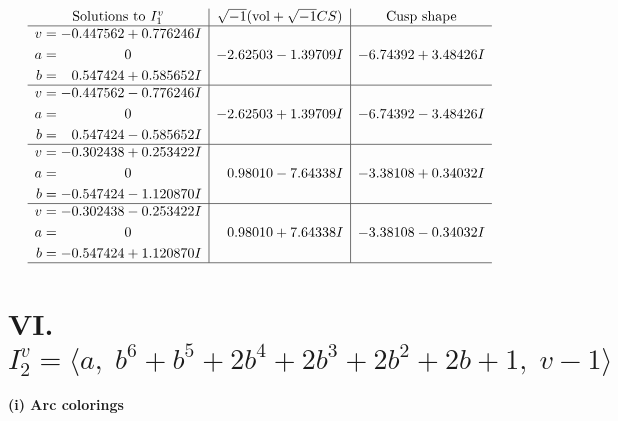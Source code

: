 \documentclass[1p]{elsarticle_modified}
\theoremstyle{definition}
\newcommand{\I}{\sqrt{-1}}
\begin{document}
$$\begin{array}{c|c|c}  
\text{Solutions to }I^v_{1}& \I (\text{vol} + \sqrt{-1}CS) & \text{Cusp shape}\\
 \hline 
\begin{aligned}
v &= -0.447562 + 0.776246 I \\
a &= \phantom{-0.000000 } 0 \\
b &= \phantom{-}0.547424 + 0.585652 I\end{aligned}
 & -2.62503 - 1.39709 I & -6.74392 + 3.48426 I \\ \hline\begin{aligned}
v &= -0.447562 - 0.776246 I \\
a &= \phantom{-0.000000 } 0 \\
b &= \phantom{-}0.547424 - 0.585652 I\end{aligned}
 & -2.62503 + 1.39709 I & -6.74392 - 3.48426 I \\ \hline\begin{aligned}
v &= -0.302438 + 0.253422 I \\
a &= \phantom{-0.000000 } 0 \\
b &= -0.547424 - 1.120870 I\end{aligned}
 & \phantom{-}0.98010 - 7.64338 I & -3.38108 + 0.34032 I \\ \hline\begin{aligned}
v &= -0.302438 - 0.253422 I \\
a &= \phantom{-0.000000 } 0 \\
b &= -0.547424 + 1.120870 I\end{aligned}
 & \phantom{-}0.98010 + 7.64338 I & -3.38108 - 0.34032 I\\
 \hline 
 \end{array}$$\newpage\newpage\renewcommand{\arraystretch}{1}
\centering \section*{VI. $I^v_{2}= \langle a,\;b^6+b^5+2 b^4+2 b^3+2 b^2+2 b+1,\;v-1 \rangle$}
\flushleft \textbf{(i) Arc colorings}\\
\end{document}
